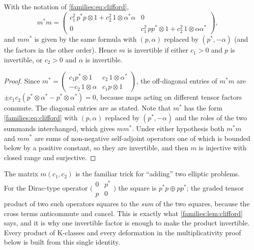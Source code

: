 \begin{lemma}\label{families:lem:clifford}
  With the notation of \eqref{families:eq:clifford},
  \begin{equation*}
    m^*m=\begin{pmatrix}c_1^2\,p^*p\otimes1+c_2^2\,1\otimes\alpha^*\alpha&0\\
    0&c_1^2\,pp^*\otimes1+c_2^2\,1\otimes\alpha\alpha^*\end{pmatrix},
  \end{equation*}
  and $mm^*$ is given by the same formula with $(p,\alpha)$ replaced by
  $(p^*,-\alpha)$ (and the factors in the other order). Hence $m$ is invertible
  if either $c_1>0$ and $p$ is invertible, or $c_2>0$ and $\alpha$ is
  invertible.
\end{lemma}
\begin{proof}
  Since $m^*=\begin{pmatrix}c_1p^*\otimes1&c_2\,1\otimes\alpha^*\\
  -c_2\,1\otimes\alpha&c_1p\otimes1\end{pmatrix}$, the off-diagonal entries of
  $m^*m$ are $\pm c_1c_2(p^*\otimes\alpha^*-p^*\otimes\alpha^*)=0$, because
  maps acting on different tensor factors commute. The diagonal entries are as
  stated. Note that $m^*$ has the form \eqref{families:eq:clifford} with
  $(p,\alpha)$ replaced by $(p^*,-\alpha)$ and the roles of the two summands
  interchanged, which gives $mm^*$. Under either hypothesis both $m^*m$ and
  $mm^*$ are sums of non-negative self-adjoint operators one of which is
  bounded below by a positive constant, so they are invertible, and then $m$ is
  injective with closed range and surjective.
\end{proof}

\begin{discussion}
  The matrix $m(c_1,c_2)$ is the familiar trick for ``adding'' two elliptic
  problems. For the Dirac-type operator $\bigl(\begin{smallmatrix}0&p^*\\p&0
  \end{smallmatrix}\bigr)$ the square is $p^*p\oplus pp^*$; the graded tensor
  product of two such operators squares to the \emph{sum} of the two squares,
  because the cross terms anticommute and cancel. This is exactly what
  \cref{families:lem:clifford} says, and it is why one invertible factor is
  enough to make the product invertible. Every product of K-classes and every
  deformation in the multiplicativity proof below is built from this single
  identity.
\end{discussion}

